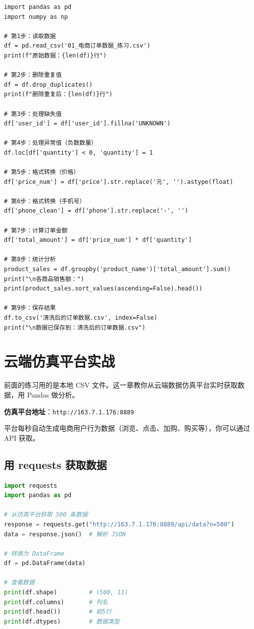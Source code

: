 \documentclass[12pt,a4paper]{article}
\begin{document}
\begin{lstlisting}[caption={完整的数据处理流程}]
import pandas as pd
import numpy as np

# 第1步：读取数据
df = pd.read_csv('01_电商订单数据_练习.csv')
print(f"原始数据：{len(df)}行")

# 第2步：删除重复值
df = df.drop_duplicates()
print(f"删除重复后：{len(df)}行")

# 第3步：处理缺失值
df['user_id'] = df['user_id'].fillna('UNKNOWN')

# 第4步：处理异常值（负数数量）
df.loc[df['quantity'] < 0, 'quantity'] = 1

# 第5步：格式转换（价格）
df['price_num'] = df['price'].str.replace('元', '').astype(float)

# 第6步：格式转换（手机号）
df['phone_clean'] = df['phone'].str.replace('-', '')

# 第7步：计算订单金额
df['total_amount'] = df['price_num'] * df['quantity']

# 第8步：统计分析
product_sales = df.groupby('product_name')['total_amount'].sum()
print("\n各商品销售额：")
print(product_sales.sort_values(ascending=False).head())

# 第9步：保存结果
df.to_csv('清洗后的订单数据.csv', index=False)
print("\n数据已保存到：清洗后的订单数据.csv")
\end{lstlisting}

\section{云端仿真平台实战}

\begin{knowledgebox}[这一章要做什么？]
前面的练习用的是本地 CSV 文件。这一章教你从云端数据仿真平台实时获取数据，用 Pandas 做分析。

\textbf{仿真平台地址}：\texttt{http://163.7.1.176:8889}

平台每秒自动生成电商用户行为数据（浏览、点击、加购、购买等），你可以通过 API 获取。
\end{knowledgebox}

\subsection{用 requests 获取数据}

\begin{lstlisting}[language=Python]
import requests
import pandas as pd

# 从仿真平台获取 500 条数据
response = requests.get("http://163.7.1.176:8889/api/data?n=500")
data = response.json()  # 解析 JSON

# 转换为 DataFrame
df = pd.DataFrame(data)

# 查看数据
print(df.shape)         # (500, 11)
print(df.columns)       # 列名
print(df.head())        # 前5行
print(df.dtypes)        # 数据类型
\end{lstlisting}
\end{document}
